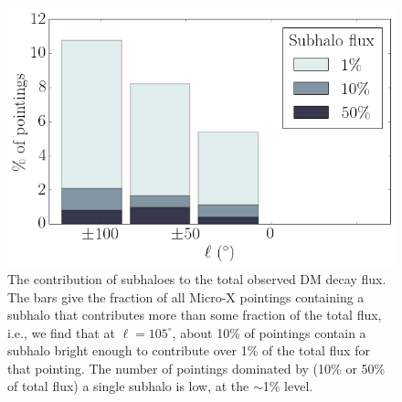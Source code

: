 \documentclass[aps,prd,10pt,twocolumn,superscriptaddress,showpacs]{revtex4-1}
\begin{document}
\begin{figure}[h!]
\centering
\includegraphics[width=1.0\columnwidth]{subhalo_flux.png}
\caption{ 
	The contribution of subhaloes to the total observed DM decay flux. 
	The bars give the fraction of all Micro-X pointings containing a subhalo that
	contributes more than some fraction of the total flux, i.e., we find that at $\ell=105^\circ$,
	about 10\% of pointings contain a subhalo bright enough to contribute over 1\% of the total flux
	for that pointing. The number of pointings dominated by (10\% or 50\% of total flux) a single subhalo is low, at
	the $\sim$1\% level.
}
\label{fig:subhalo_flux}
\end{figure}
\end{document}

